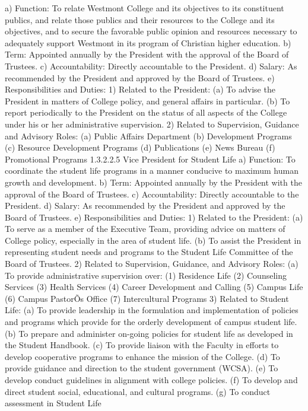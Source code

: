 \documentclass[letterpaper, 11pt]{article}
\begin{document}
a) Function:  To relate Westmont College and its objectives to its constituent publics, and relate those publics and their resources to the College and its objectives, and to secure the favorable public opinion and resources necessary to adequately support Westmont in its program of Christian higher education.
b) Term:  Appointed annually by the President with the approval of the Board of Trustees.
c) Accountability:  Directly accountable to the President.
d) Salary:  As recommended by the President and approved by the Board of Trustees.
e) Responsibilities and Duties:
1) Related to the President:
(a) To advise the President in matters of College policy, and general affairs in particular.
(b) To report periodically to the President on the status of all aspects of the College under his or her administrative supervision.
2) Related to Supervision, Guidance and Advisory Roles:
(a) Public Affairs Department
(b) Development Programs
(c) Resource Development Programs
(d) Publications
(e) News Bureau
(f) Promotional Programs
1.3.2.2.5 Vice President for Student Life
a) Function: To coordinate the student life programs in a manner conducive to maximum human growth and development.
b) Term: Appointed annually by the President with the approval of the Board of Trustees.
c) Accountability: Directly accountable to the President.
d) Salary: As recommended by the President and approved by the Board of Trustees.
e) Responsibilities and Duties:
1) Related to the President:
(a) To serve as a member of the Executive Team, providing advice on matters of College policy, especially in the area of student life.
(b) To assist the President in representing student needs and programs to the Student Life Committee of the Board of Trustees.
2) Related to Supervision, Guidance, and Advisory Roles:
(a) To provide administrative supervision over:
(1) Residence Life
(2) Counseling Services
(3) Health Services
(4) Career Development and Calling
(5) Campus Life
(6) Campus PastorÕs Office
(7) Intercultural Programs
3) Related to Student Life:
(a) To provide leadership in the formulation and implementation of policies and programs which provide for the orderly development of campus student life.
(b) To prepare and administer on-going policies for student life as developed in the Student Handbook.
(c) To provide liaison with the Faculty in efforts to develop cooperative programs to enhance the mission of the College.
(d) To provide guidance and direction to the student government (WCSA).
(e) To develop conduct guidelines in alignment with college policies.
(f) To develop and direct student social, educational, and cultural programs.
(g) To conduct assessment in Student Life
\end{document}
